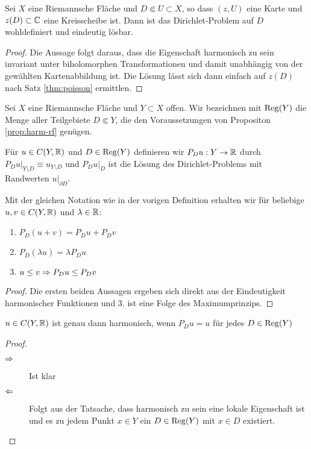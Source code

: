 \begin{prop}
  \label{prop:harm-rf}
  Sei $X$ eine Riemannsche Fläche und $D \Subset U \subset X$, so dass
  $(z, U)$ eine Karte und $z(D) \subset \mathbb{C}$ eine Kreisscheibe
  ist. Dann ist das Dirichlet-Problem auf $D$ wohldefiniert und
  eindeutig lösbar.
\end{prop}

\begin{proof}
  Die Aussage folgt daraus, dass die Eigenschaft harmonisch zu sein
  invariant unter biholomorphen Transformationen und damit unabhängig
  von der gewählten Kartenabbildung ist. Die Lösung lässt sich dann
  einfach auf $z(D)$ nach Satz \ref{thm:poisson} ermittlen.
\end{proof}

\begin{defin}
  Sei $X$ eine Riemannsche Fläche und $Y \subset X$ offen. Wir
  bezeichnen mit $\operatorname{Reg}(Y)$ die Menge aller Teilgebiete $D \Subset
  Y$, die den Voraussetzungen von Propositon \ref{prop:harm-rf}
  genügen.
  
  Für $u \in C(Y, \mathbb{R})$ und $D \in \operatorname{Reg}(Y)$ definieren wir $P_D u: Y
  \rightarrow \mathbb{R}$ durch $P_D u |_{Y \setminus D} \equiv u_{Y \setminus D}$ und
  $P_Du|_D$ ist die Lösung des Dirichlet-Problems mit Randwerten
  $u|_{\partial D}$.
\end{defin}

\begin{cor}
  \label{cor:pd-rechenregeln}
  Mit der gleichen Notation wie in der vorigen Definition erhalten wir
  für beliebige $u, v\in C(Y, \mathbb{R})$ und $\lambda \in \mathbb{R}$:
  \begin{enumerate}
  \item $P_D(u+v) = P_Du + P_D v$
  \item $P_D(\lambda u) = \lambda P_D u$
  \item $u \leq v \Rightarrow P_Du \leq P_D v$
  \end{enumerate}
\end{cor}

\begin{proof}
  Die ersten beiden Aussagen ergeben sich direkt aus der Eindeutigkeit
  harmonischer Funktionen und 3. ist eine Folge des Maximumprinzips.
\end{proof}

\begin{cor}
  $u \in C(Y, \mathbb{R})$ ist genau dann harmonisch, wenn $P_Du = u $ für
  jedes $D \in \operatorname{Reg}(Y)$
\end{cor}

\begin{proof}
  \begin{description}
  \item[$\Rightarrow$] Ist klar
  \item[$\Leftarrow$] Folgt aus der Tatsache, dass harmonisch zu sein eine
    lokale Eigenschaft ist und es zu jedem Punkt $x \in Y$ ein $D \in
    \operatorname{Reg}(Y)$ mit $x \in D$ existiert.
  \end{description}
\end{proof}

